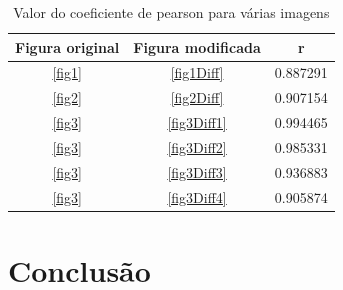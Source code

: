 \documentclass[10pt,a4paper]{article}
\begin{document}
\begin{table}
  \begin{center}
    \caption{Valor do coeficiente de pearson para várias imagens}
    \begin{tabular}{|c|c|c|}
      \hline
      
      Figura original & Figura modificada & r\\
      \hline
      \ref{fig1} &  \ref{fig1Diff} &  0.887291 \\
      \ref{fig2} &  \ref{fig2Diff} &  0.907154\\
      \ref{fig3} &  \ref{fig3Diff1} & 0.994465\\
      \ref{fig3} & \ref{fig3Diff2} &  0.985331\\
      \ref{fig3} &  \ref{fig3Diff3} &  0.936883\\
      \ref{fig3} &  \ref{fig3Diff4} &  0.905874\\
      \hline
    \end{tabular}
  \end{center}
\end{table}
\section{Conclusão}


\begin{small}
  
\end{small}
\end{document}
